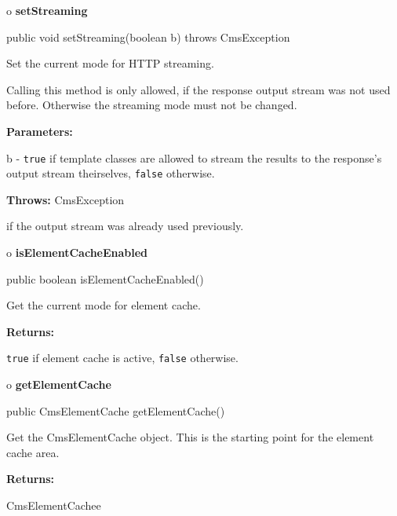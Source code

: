 o {\bf setStreaming} 

\begin{PRE}
 public void setStreaming(boolean b) throws CmsException
\end{PRE}

\begin{description}
\htmlDD Set the current mode for HTTP streaming.

Calling this method is only allowed, if the response output stream was not
used before. Otherwise the streaming mode must not be changed. 

\begin{description}
\item {\bf Parameters:}  

b - {\tt true} if template classes are allowed to stream the  results to the
response's output stream theirselves, {\tt false} otherwise.  
\item {\bf Throws:} CmsException  

if the output stream was already used previously.  
\end{description}

\end{description}

o {\bf isElementCacheEnabled} 

\begin{PRE}
 public boolean isElementCacheEnabled()
\end{PRE}

\begin{description}
\htmlDD Get the current mode for element cache. 

\begin{description}
\item {\bf Returns:}  

{\tt true} if element cache is active, {\tt false} otherwise.  
\end{description}

\end{description}

o {\bf getElementCache} 

\begin{PRE}
 public CmsElementCache getElementCache()
\end{PRE}

\begin{description}
\htmlDD Get the CmsElementCache object. This is the starting point for the
element cache area. 

\begin{description}
\item {\bf Returns:}  

CmsElementCachee  
\end{description}

\end{description}

